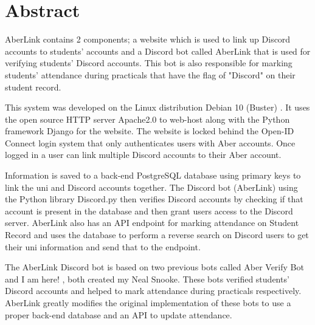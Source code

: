 \thispagestyle{empty}


\section*{\centering Abstract}

AberLink contains 2 components; a website which is used to link up Discord \cite{discord} accounts to students' accounts and a Discord bot called AberLink that is used for verifying students' Discord accounts. This bot is also responsible for marking students' attendance during practicals that have the flag of "Discord" on their student record.

This system was developed on the Linux distribution Debian 10 (Buster) \cite{debian}. It uses the open source HTTP server Apache2.0 \cite{apache2} to web-host along with the Python framework Django \cite{Django} for the website. The website is locked behind the Open-ID Connect \cite{OpenID} login system that only authenticates users with Aber accounts. Once logged in a user can link multiple Discord accounts to their Aber account. 

Information is saved to a back-end  PostgreSQL \cite{psql} database using primary keys to link the uni and Discord accounts together. The Discord bot (AberLink) using the Python library Discord.py \cite{discord.py} then verifies Discord accounts by checking if that account is present in the database and then grant users access to the Discord server. AberLink also has an API endpoint for marking attendance on Student Record and uses the database to perform a reverse search on Discord users to get their uni information and send that to the endpoint.

The AberLink Discord bot is based on two previous bots called Aber Verify Bot \cite{aber_verify} and I am here! \cite{i_am_here}, both created my Neal Snooke. These bots verified students' Discord accounts and helped to mark attendance during practicals respectively. AberLink greatly modifies the original implementation of these bots to use a proper back-end database and an API to update attendance.

